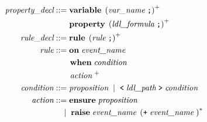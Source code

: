 \documentclass[preview=true]{standalone}
\begin{document}
\begin{table}[t]
\begin{align*}
  \textit{property\_decl} &::=
  \textbf{variable}\;
    \left( \textit{var\_name}\; \texttt{;} \right)^+
  \\&\hspace{1.9em}
  \textbf{property}\;
  \left(\textit{ldl\_formula}\; \texttt{;}\right)^+
  \\
  \textit{rule\_decl} &::= \textbf{rule}\;
  \left( \textit{rule}\; \texttt{;} \right)^+
  \\
  \textit{rule} &::=
  \textbf{on}\; \textit{event\_name}\;
  \\&\qquad
  \textbf{when}\; \textit{condition}\;
  \\&\qquad
  \textit{action}\;^+
  \\
  \textit{condition} &::= \textit{proposition}\;
  \mid\;
  \texttt{<}\; \textit{ldl\_path}\; \texttt{>}\; \textit{condition}
  \\
  \textit{action} &::=
  \textbf{ensure}\; \textit{proposition}\;
  \\&\quad
  \mid\;
  \textbf{raise}\; \textit{event\_name}\; \left(\texttt{+}\; \textit{event\_name}\; \right)^\ast\;
  \\
\end{align*}
\end{table}
\smallskip
\end{document}
